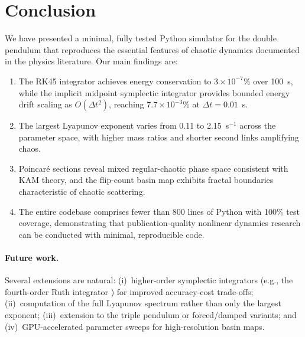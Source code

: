 \documentclass[11pt,a4paper]{article}
\newcommand{\dt}{\Delta t}
\begin{document}
\section{Conclusion}\label{sec:conclusion}

We have presented a minimal, fully tested Python simulator for the double
pendulum that reproduces the essential features of chaotic dynamics documented
in the physics literature. Our main findings are:

\begin{enumerate}
  \item The RK45 integrator achieves energy conservation to $3 \times 10^{-7}$\%
        over 100~s, while the implicit midpoint symplectic integrator provides
        bounded energy drift scaling as $O(\dt^2)$, reaching $7.7 \times
        10^{-3}$\% at $\dt = 0.01$~s.
  \item The largest Lyapunov exponent varies from 0.11 to 2.15~s$^{-1}$ across
        the parameter space, with higher mass ratios and shorter second links
        amplifying chaos.
  \item Poincar\'e sections reveal mixed regular-chaotic phase space consistent
        with KAM theory, and the flip-count basin map exhibits fractal
        boundaries characteristic of chaotic scattering.
  \item The entire codebase comprises fewer than 800 lines of Python with 100\%
        test coverage, demonstrating that publication-quality nonlinear dynamics
        research can be conducted with minimal, reproducible code.
\end{enumerate}

\paragraph{Future work.}
Several extensions are natural: (i)~higher-order symplectic integrators
(e.g., the fourth-order Ruth integrator \citep{ruth1983canonical}) for
improved accuracy-cost trade-offs; (ii)~computation of the full Lyapunov
spectrum rather than only the largest exponent; (iii)~extension to the
triple pendulum or forced/damped variants; and (iv)~GPU-accelerated
parameter sweeps for high-resolution basin maps.



\end{document}
